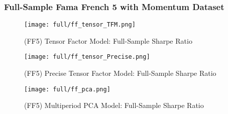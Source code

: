 \subsubsection{Full-Sample Fama French 5 with Momentum Dataset}

\begin{figure}[H]
    \centering
    \texttt{[image: full/ff\_tensor\_TFM.png]}
    \caption{(FF5) Tensor Factor Model: Full-Sample Sharpe Ratio}
    \label{fig:ff-primary-tfm}
\end{figure}

\begin{figure}[H]
    \centering
    \texttt{[image: full/ff\_tensor\_Precise.png]}
    \caption{(FF5) Precise Tensor Factor Model: Full-Sample Sharpe Ratio}
    \label{fig:ff-primary-precise}
\end{figure}


\begin{figure}[H]
    \centering
    \texttt{[image: full/ff\_pca.png]}
    \caption{(FF5) Multiperiod PCA Model: Full-Sample Sharpe Ratio}
    \label{fig:ff-primary-pca}
\end{figure}
